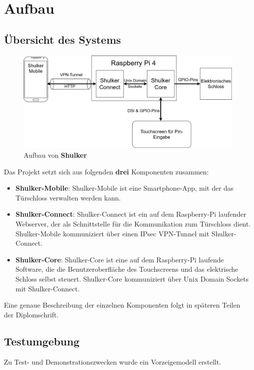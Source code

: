 \chapter{Aufbau}

\section{Übersicht des Systems}


\begin{figure}[H]
	\begin{center}
		\includegraphics[width=1\textwidth]{images/Intro/Leitbild.png}
		\caption{Aufbau von \textbf{Shulker}}
	\end{center}
\end{figure}

Das Projekt setzt sich aus folgenden \textbf{drei} Komponenten zusammen:


\begin{itemize}
    \item \textbf{Shulker-Mobile}: Shulker-Mobile ist eine Smartphone-App, mit der das Türschloss verwalten werden kann.
    \item \textbf{Shulker-Connect}: Shulker-Connect ist ein auf dem Raspberry-Pi laufender Webserver, der als Schnittstelle für die Kommunikation zum Türschloss dient. Shulker-Mobile kommuniziert über einen IPsec VPN-Tunnel mit Shulker-Connect.
    \item \textbf{Shulker-Core}: Shulker-Core ist eine auf dem Raspberry-Pi laufende Software, die die Benutzeroberfläche des Touchscreens und das elektrische Schloss selbst steuert. Shulker-Core kommuniziert über Unix Domain Sockets mit Shulker-Connect.
\end{itemize}

Eine genaue Beschreibung der einzelnen Komponenten folgt in späteren Teilen der Diplomschrift. 

\section{Testumgebung}

Zu Test- und Demonstrationszwecken wurde ein Vorzeigemodell erstellt.

